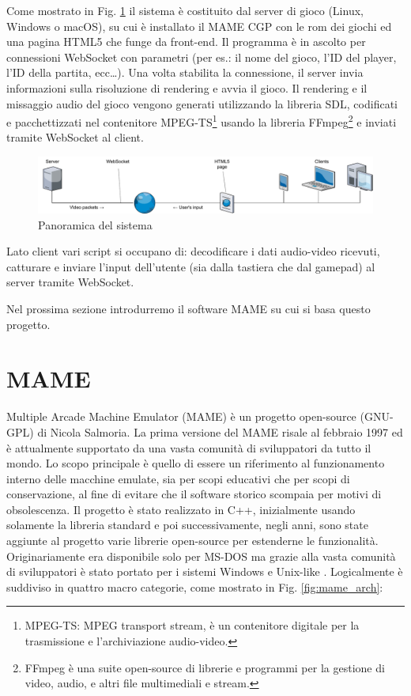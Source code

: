 Come mostrato in Fig. \ref{fig:proposed_system} il sistema è costituito dal server di gioco (Linux, Windows o macOS), su cui è installato il MAME CGP con le rom dei giochi ed una pagina HTML5 che funge da front-end. Il programma è in ascolto per connessioni WebSocket con parametri (per es.: il nome del gioco, l'ID del player, l'ID della partita, ecc\dots). Una volta stabilita la connessione, il server invia informazioni sulla risoluzione di rendering e avvia il gioco. Il rendering e il missaggio audio del gioco vengono generati utilizzando la libreria SDL, codificati e pacchettizzati nel contenitore MPEG-TS\footnote{MPEG-TS: MPEG transport stream, è un contenitore digitale per la trasmissione e l'archiviazione audio-video.} usando la libreria FFmpeg\footnote{FFmpeg è una suite open-source di librerie e programmi per la gestione di video, audio, e altri file multimediali e stream.} e inviati tramite WebSocket al client.

\begin{figure}[H]
	\includegraphics[width=\linewidth]{immagini/proposed_system}
	\caption{Panoramica del sistema}
	\label{fig:proposed_system}
\end{figure}

Lato client vari script si occupano di: decodificare i dati audio-video ricevuti, catturare e inviare l'input dell'utente (sia dalla tastiera che dal gamepad) al server tramite WebSocket.

Nel prossima sezione introdurremo il software MAME su cui si basa questo progetto.

\section{MAME}
Multiple Arcade Machine Emulator (MAME) è un progetto open-source (GNU-GPL) di Nicola Salmoria. La prima versione del MAME risale al febbraio 1997 ed è attualmente supportato da una vasta comunità di sviluppatori da tutto il mondo. Lo scopo principale è quello di essere un riferimento al funzionamento interno delle macchine emulate, sia per scopi educativi che per scopi di conservazione, al fine di evitare che il software storico scompaia per motivi di obsolescenza. Il progetto è stato realizzato in C++, inizialmente usando solamente la libreria standard e poi successivamente, negli anni, sono state aggiunte al progetto varie librerie open-source per estenderne le funzionalità. Originariamente era disponibile solo per MS-DOS ma grazie alla vasta comunità di sviluppatori è stato portato per i sistemi Windows e Unix-like \parencite{MAME}. Logicalmente è suddiviso in quattro macro categorie, come mostrato in Fig. \ref{fig:mame_arch}:

